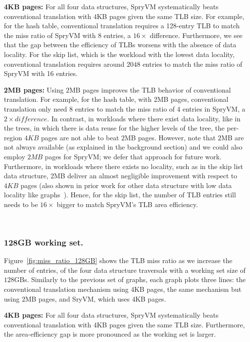 \noindent\textbf{4KB pages:} For all four data structures, SpryVM
systematically beats conventional translation with $4$KB pages given
the same TLB size. For example, for the hash table, conventional
translation requires a 128-entry TLB to match the miss ratio of SpryVM
with 8 entries, a $16\times$ difference. Furthermore, we see that the
gap between the efficiency of TLBs worsens with the absence of data
locality. For the skip list, which is the workload with the lowest
data locality, conventional translation requires around $2048$ entries
to match the miss ratio of SpryVM with 16 entries.

\noindent\textbf{2MB pages:} Using $2$MB pages improves the TLB behavior of conventional translation. For example, for the hash table, with 2MB pages, conventional translation only need 8 entries to match the miss ratio of 4 entries in SpryVM, a $2\times difference$. In contrast, in workloads where there exist data locality, like in the trees, in which there is data reuse for the higher levels of the tree, the per-region $4KB$ pages are not able to beat $2$MB pages. However, note that $2$MB are not always available (as explained in the background section) and we could also employ $2MB$ pages for SpryVM; we defer that approach for future work. Furthermore, in workloads where there exists no locality, such as in the skip list data structure, $2$MB deliver an almost negligible improvement with respect to $4KB$ pages (also shown in prior work for other data structure with low data locality like graphs~\cite{haria:devirtualizing}). Hence, for the skip list, the number of TLB entries still needs to be $16\times$ bigger to match SpryVM's TLB area efficiency.

~\subsubsection{128GB working set.} Figure~\ref{fig:miss_ratio_128GB} shows the TLB miss ratio as we increase the number of entries, of the four data structure traversals with a working set size of $128$GBs. Similarly to the previous set of graphs, each graph plots three lines: the conventional translation mechanism using 4KB pages, the same mechanism but using $2$MB pages, and SryVM, which uses $4$KB pages.

\noindent\textbf{4KB pages:} For all four data structures, SpryVM systematically beats conventional translation with $4$KB pages given the same TLB size. Furthermore, the area-efficiency gap is more pronounced as the working set is larger. 

